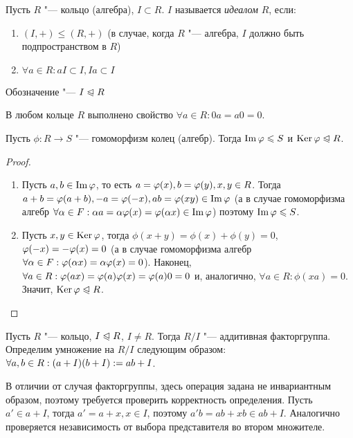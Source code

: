 \begin{definition}
	Пусть $R$ "--- кольцо (алгебра), $I \subset R$. $I$ называется \textit{идеалом} $R$, если:
	\begin{enumerate}
		\item $(I, +) \le (R, +)$ (в случае, когда $R$ "--- алгебра, $I$ должно быть подпространством в $R$)
		\item $\forall a \in R: aI \subset I, Ia \subset I$
	\end{enumerate}
	
	Обозначение "--- $I \trianglelefteqslant R$
\end{definition}

\begin{reminder}
	В любом кольце $R$ выполнено свойство $\forall a \in R: 0a = a0 = 0$.
\end{reminder}

\begin{proposition}
	Пусть $\phi: R \to S$ "--- гомоморфизм колец (алгебр). Тогда $\operatorname{Im}\varphi \leqslant S$ и $\operatorname{Ker}\varphi \trianglelefteqslant R$.
\end{proposition}

\begin{proof}~
	\begin{enumerate}
		\item Пусть $a, b \in \operatorname{Im}\varphi$, то есть $a = \phi(x), b = \phi(y), x, y \hm\in R$. Тогда $a + b = \phi(a + b), -a \hm= \phi(-x), ab = \phi(xy) \in \im\phi$ (а в случае гомоморфизма алгебр $\forall \alpha \in F: \alpha a = \alpha\phi(x) \hm= \phi(\alpha x) \in \im\phi$) поэтому $\operatorname{Im}\varphi \leqslant S$.
		\item Пусть $x, y \in \operatorname{Ker}\varphi$, тогда $\phi(x + y) = \phi(x) + \phi(y) = 0$, $\phi(-x) \hm= -\phi(x) = 0$ (а в случае гомоморфизма алгебр $\forall \alpha \in F: \phi(\alpha x) \hm= \alpha\phi(x) = 0$). Наконец, $\forall a \in R: \phi(ax) \hm= \phi(a)\phi(x) \hm= \phi(a)0 = 0$ и, аналогично, $\forall a \in R: \phi(xa) = 0$. Значит, $\operatorname{Ker}\varphi \trianglelefteqslant R$.
	\end{enumerate}
\end{proof}

\begin{definition}
	Пусть $R$ "--- кольцо, $I \trianglelefteqslant R$, $I \ne R$. Тогда $R / I$ "--- аддитивная факторгруппа. Определим умножение на $R / I$ следующим образом: $\forall a, b \in R: (a + I)(b + I) \hm{:=} ab + I$.
\end{definition}

\begin{note}
	В отличии от случая факторгруппы, здесь операция задана не инвариантным образом, поэтому требуется проверить корректность определения. Пусть $a' \in a + I$, тогда $a' = a + x, x \in I$, поэтому $a'b = ab + xb \in ab + I$. Аналогично проверяется независимость от выбора представителя во втором множителе.
\end{note}

